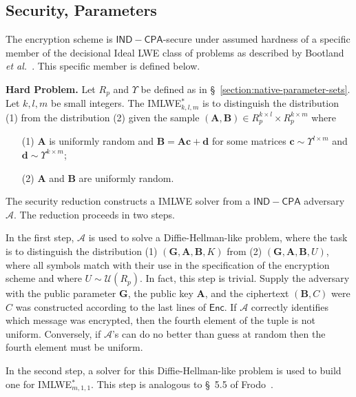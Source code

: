 \subsection{Security, Parameters}
\label{section:security-parameters}

The encryption scheme is $\mathsf{IND-CPA}$-secure under assumed hardness of a specific member of the decisional Ideal LWE class of problems as described by Bootland \emph{et al.}~\cite{BootlandCSV21}. This specific member is defined below.

\vspace{0.25cm}

\textbf{Hard Problem.} Let $R_p$ and $\Upsilon$ be defined as in \S~\ref{section:native-parameter-sets}. Let $k, l, m$ be small integers. The IMLWE$^*_{k,l,m}$ is to distinguish the distribution (1) from the distribution (2) given the sample $(\mathbf{A}, \mathbf{B}) \in R_p^{k \times l} \times R_p^{k \times m}$ where
\begin{itemize}
\item[(1)] $\mathbf{A}$ is uniformly random and $\mathbf{B} = \mathbf{A} \mathbf{c} + \mathbf{d}$ for some matrices $\mathbf{c} \sim \Upsilon^{l \times m}$ and $\mathbf{d} \sim \Upsilon^{k \times m}$;
\item[(2)] $\mathbf{A}$ and $\mathbf{B}$ are uniformly random.
\end{itemize}

\vspace{0.25cm}

The security reduction constructs a IMLWE solver from a $\mathsf{IND-CPA}$ adversary $\mathcal{A}$. The reduction proceeds in two steps.

In the first step, $\mathcal{A}$ is used to solve a Diffie-Hellman-like problem, where the task is to distinguish the distribution (1) $(\mathbf{G}, \mathbf{A}, \mathbf{B}, K)$ from (2) $(\mathbf{G}, \mathbf{A}, \mathbf{B}, U)$, where all symbols match with their use in the specification of the encryption scheme and where $U \sim \mathcal{U}(R_p)$. In fact, this step is trivial. Supply the adversary with the public parameter $\mathbf{G}$, the public key $\mathbf{A}$, and the ciphertext $(\mathbf{B}, C)$ were $C$ was constructed according to the last lines of $\mathsf{Enc}$. If $\mathcal{A}$ correctly identifies which message was encrypted, then the fourth element of the tuple is not uniform. Conversely, if $\mathcal{A}$'s can do no better than guess at random then the fourth element must be uniform.

In the second step, a solver for this Diffie-Hellman-like problem is used to build one for IMLWE$^*_{m, 1, 1}$. This step is analogous to \S~5.5 of Frodo~\cite{frodo}.

